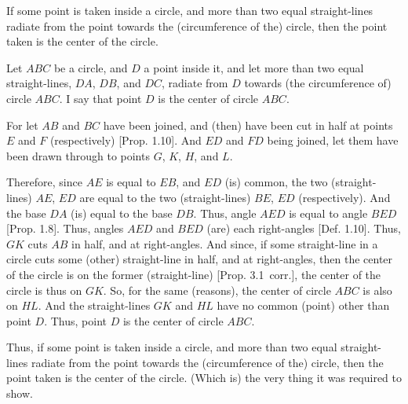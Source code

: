 \begin{Parallel}{}{}
{If  some point is taken inside a circle, and more than two equal straight-lines
radiate from the point towards the (circumference of the) circle, then the
point taken  is the center of the circle.

Let $ABC$ be a circle, and $D$ a point inside it, and let more than two equal
straight-lines, $DA$, $DB$, and $DC$, radiate from $D$ towards (the circumference of) circle
$ABC$. I say that point $D$ is the center of circle $ABC$.

\epsfysize=2.2in
\centerline{}

For let $AB$ and $BC$ have been joined, and (then) have been cut in half at points $E$ and $F$ 
(respectively) [Prop. 1.10]. And $ED$ and $FD$ being joined, let them have been
drawn through to points $G$, $K$, $H$, and $L$.

Therefore, since $AE$ is equal to $EB$, and $ED$ (is) common, the two (straight-lines) $AE$, $ED$ are equal to the two (straight-lines) $BE$, $ED$ (respectively). And the 
base $DA$ (is) equal to the base $DB$. Thus, angle $AED$ is equal to
angle $BED$ [Prop. 1.8]. Thus, angles $AED$ and $BED$ (are) each right-angles [Def. 1.10]. Thus, $GK$ cuts $AB$ in half, and at right-angles. And since,
if some straight-line in a circle cuts some (other) straight-line in half,
and at right-angles, then the center of the circle is on the former (straight-line)
[Prop. 3.1~corr.], the center of the circle is thus on $GK$. So, for the
same (reasons), the center of circle $ABC$ is also on $HL$. And the straight-lines
$GK$ and $HL$ have no  common (point) other than point $D$. Thus, point
$D$ is the center of circle $ABC$.

Thus, if some point is taken inside a circle, and more than two equal straight-lines
radiate from the point towards the (circumference of the) circle, then the
point taken  is the center of the circle. (Which is) the very thing it was
required to show.}
\end{Parallel}

